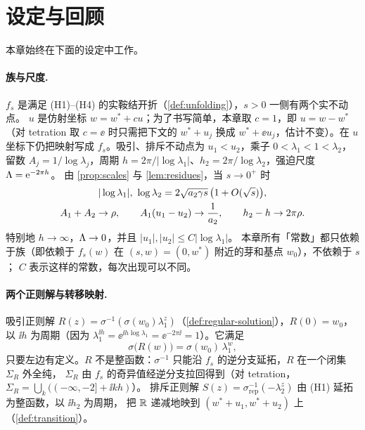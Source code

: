 \section{设定与回顾}\label{ch6:sec:setup}

本章始终在下面的设定中工作。

\paragraph{族与尺度.}
$f_s$ 是满足 (H1)--(H4) 的实鞍结开折（\cref{def:unfolding}），$s>0$ 一侧有两个实不动点。
$u$ 是仿射坐标 $w=w^*+cu$；为了书写简单，本章取 $c=1$，即 $u=w-w^*$
（对 tetration 取 $c=\ee$ 时只需把下文的 $w^*+u_j$ 换成 $w^*+\ee u_j$，估计不变）。在 $u$ 坐标下仍把映射写成 $f_s$。吸引、排斥不动点为 $u_1<u_2$，乘子 $0<\lambda_1<1<\lambda_2$，
留数 $A_j=1/\log\lambda_j$，周期 $h=2\pi/|\log\lambda_1|$、$h_2=2\pi/\log\lambda_2$，强迫尺度 $\Lambda=\mathrm{e}^{-2\pi h}$。
由 \cref{prop:scales} 与 \cref{lem:residues}，当 $s\to0^+$ 时
\begin{gather}\label{ch6:eq:scales}
 |\log\lambda_1|,\ \log\lambda_2=2\sqrt{a_2\gamma s}\,\bigl(1+O(\sqrt s)\bigr),\\
 A_1+A_2\to\rho,\qquad A_1(u_1-u_2)\to\frac1{a_2},\qquad h_2-h\to2\pi\rho .\notag
\end{gather}
特别地 $h\to\infty$，$\Lambda\to0$，并且 $|u_1|,|u_2|\le C|\log\lambda_1|$。
本章所有「常数」都只依赖于族（即依赖于 $f_s(w)$ 在 $(s,w)=(0,w^*)$ 附近的芽和基点 $w_0$），不依赖于 $s$；
$C$ 表示这样的常数，每次出现可以不同。

\paragraph{两个正则解与转移映射.}
吸引正则解 $R(z)=\sigma^{-1}(\sigma(w_0)\lambda_1^{z})$（\cref{def:regular-solution}），$R(0)=w_0$，
以 $\ii h$ 为周期（因为 $\lambda_1^{\ii h}=\ee^{\ii h\log\lambda_1}=\ee^{-2\pi\ii}=1$）。它满足
\begin{equation}\label{ch6:eq:sigmaR}
 \sigma\bigl(R(w)\bigr)=\sigma(w_0)\,\lambda_1^{w},
\end{equation}
只要左边有定义。$R$ 不是整函数：$\sigma^{-1}$ 只能沿 $f_s$ 的逆分支延拓，$R$ 在一个闭集 $\Sigma_R$ 外全纯，
$\Sigma_R$ 由 $f_s$ 的奇异值经逆分支拉回得到（对 tetration，$\Sigma_R=\bigcup_k((-\infty,-2]+\ii kh)$）。
排斥正则解 $S(z)=\sigma_{\mathrm{rep}}^{-1}(-\lambda_2^{z})$ 由 (H1) 延拓为整函数，以 $\ii h_2$ 为周期，
把 $\mathbb{R}$ 递减地映到 $(w^*+u_1,w^*+u_2)$ 上（\cref{def:transition}）。

